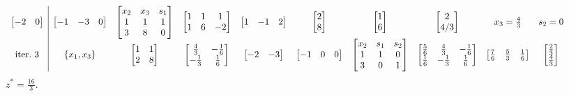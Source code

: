 \begin{equation*}
{\begin{array}{ c|c c c c c c c c c c c c c }
\begin{bmatrix}
-2 & 0
\end{bmatrix} & \begin{bmatrix}
-1 & -3 & 0
\end{bmatrix} & \begin{bmatrix}
x_{2} & x_{3} & s_{1}\\
1 & 1 & 1\\
3 & 8 & 0
\end{bmatrix} & \begin{bmatrix}
1 & 1 & 1\\
1 & 6 & -2
\end{bmatrix} & \begin{bmatrix}
1 & -1 & 2
\end{bmatrix} & \begin{bmatrix}
2\\
8
\end{bmatrix} & \begin{bmatrix}
1\\
6
\end{bmatrix} & \begin{bmatrix}
2\\
4/3
\end{bmatrix} & x_{3} =\frac{4}{3} & s_{2} =0\\
\text{iter.} \ 3 & \{x_{1} ,x_{3}\} & \begin{bmatrix}
1 & 1\\
2 & 8
\end{bmatrix} & \begin{bmatrix}
\frac{4}{3} & -\frac{1}{6}\\
-\frac{1}{3} & \frac{1}{6}
\end{bmatrix} & \begin{bmatrix}
-2 & -3
\end{bmatrix} & \begin{bmatrix}
-1 & 0 & 0
\end{bmatrix} & \begin{bmatrix}
x_{2} & s_{1} & s_{2}\\
1 & 1 & 0\\
3 & 0 & 1
\end{bmatrix} & \begin{bmatrix}
\frac{5}{6} & \frac{4}{3} & -\frac{1}{6}\\
\frac{1}{6} & -\frac{1}{3} & \frac{1}{6}
\end{bmatrix} & \begin{bmatrix}
\frac{7}{6} & \frac{5}{3} & \frac{1}{6}
\end{bmatrix} & \begin{bmatrix}
\frac{2}{3}\\
\frac{4}{3}
\end{bmatrix} &  &  &  & 
\end{array}
}
\end{equation*}
$z^{*} =\frac{16}{3}$.

